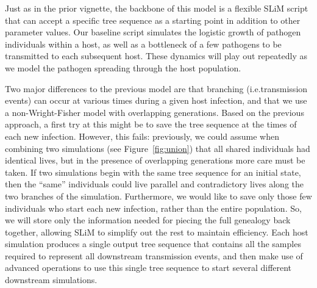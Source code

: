 \documentclass[12pt]{article}
\newcommand{\slim}[0]{\texttt{SLiM}\xspace}
\newcommand*{\ie}{i.e.\xcomma}
\begin{document}
Just as in the prior vignette, the backbone of this model is a flexible SLiM script that can accept a specific tree sequence as a starting point in addition to other
parameter values.
Our baseline script simulates the logistic growth of pathogen individuals within a host,
as well as a bottleneck of a few pathogens to be transmitted to each subsequent host.
These dynamics will play out repeatedly as we model the pathogen
spreading through the host population.

Two major differences to the previous model are that branching (\ie transmission events) can occur at various times during a given host infection,
and that we use a non-Wright-Fisher model with overlapping generations.
Based on the previous approach,
a first try at this might be to save the tree sequence at the times of each new infection.
However, this fails:
previously, we could assume when combining two simulations
(see Figure~\ref{fig:union}) that all shared individuals had identical lives,
but in the presence of overlapping generations more care must be taken.
If two simulations begin with the same tree sequence for an initial state,
then the ``same'' individuals could live parallel and contradictory lives along the two branches of the simulation.
Furthermore, we would like to save only those few individuals who start each new infection,
rather than the entire population.
So, we will store only the information needed for piecing the full genealogy back together, allowing SLiM to simplify out the rest to maintain efficiency.
Each host simulation produces a single output tree sequence
that contains all the samples required to represent all downstream transmission events,
and then make use of advanced operations to use this single tree sequence
to start several different downstream simulations.
\end{document}
